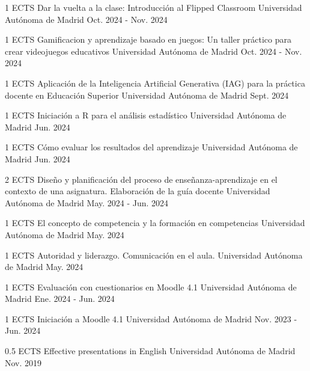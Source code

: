 \begin{cventries}
	\cventry
	{1 ECTS} %
	{Dar la vuelta a la clase: Introducción al Flipped Classroom} %
	{Universidad Autónoma de Madrid} %
	{Oct. 2024 - Nov. 2024} %
	{}
	
	\cventry
	{1 ECTS} %
	{Gamificacion y aprendizaje basado en juegos: Un taller práctico para crear videojuegos educativos} %
	{Universidad Autónoma de Madrid} %
	{Oct. 2024 - Nov. 2024} %
	{}
	
	\cventry
	{1 ECTS} %
	{Aplicación de la Inteligencia Artificial Generativa (IAG) para la práctica docente en Educación Superior} %
	{Universidad Autónoma de Madrid} %
	{Sept. 2024} %
	{}
	
	\cventry
	{1 ECTS} %
	{Iniciación a R para el análisis estadístico} %
	{Universidad Autónoma de Madrid} %
	{Jun. 2024} %
	{}
	
	\cventry
	{1 ECTS} %
	{Cómo evaluar los resultados del aprendizaje} %
	{Universidad Autónoma de Madrid} %
	{Jun. 2024} %
	{}
	
	\cventry
	{2 ECTS} %
	{Diseño y planificación del proceso de enseñanza-aprendizaje en el contexto de una asignatura. Elaboración de la guía docente} %
	{Universidad Autónoma de Madrid} %
	{May. 2024 - Jun. 2024} %
	{}
	
	\cventry
	{1 ECTS} %
	{El concepto de competencia y la formación en competencias} %
	{Universidad Autónoma de Madrid} %
	{May. 2024} %
	{}
	
	\cventry
	{1 ECTS} %
	{Autoridad y liderazgo. Comunicación en el aula.} %
	{Universidad Autónoma de Madrid} %
	{May. 2024} %
	{}
	
	\cventry
	{1 ECTS} %
	{Evaluación con cuestionarios en Moodle 4.1} %
	{Universidad Autónoma de Madrid} %
	{Ene. 2024 - Jun. 2024} %
	{}
	
	\cventry
	{1 ECTS} %
	{Iniciación a Moodle 4.1} %
	{Universidad Autónoma de Madrid} %
	{Nov. 2023 - Jun. 2024} %
	{}
	
	\cventry
	{0.5 ECTS} %
	{Effective presentations in English} %
	{Universidad Autónoma de Madrid} %
	{Nov. 2019} %
	{}
	

\end{cventries}
